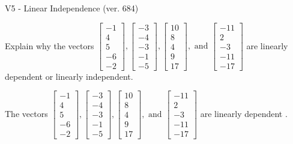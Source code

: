 \begin{exercise}
  \begin{exerciseTitle}V5 - Linear Independence (ver. 684)\end{exerciseTitle}
  \begin{exerciseStatement}
    Explain why the vectors \(\left[\begin{array}{r}
-1 \\
4 \\
5 \\
-6 \\
-2
\end{array}\right] , \left[\begin{array}{r}
-3 \\
-4 \\
-3 \\
-1 \\
-5
\end{array}\right] , \left[\begin{array}{r}
10 \\
8 \\
4 \\
9 \\
17
\end{array}\right] , \text{ and } \left[\begin{array}{r}
-11 \\
2 \\
-3 \\
-11 \\
-17
\end{array}\right]\) are linearly dependent or linearly independent.	


  \end{exerciseStatement}
  \begin{exerciseAnswer}
   The vectors \(\left[\begin{array}{r}
-1 \\
4 \\
5 \\
-6 \\
-2
\end{array}\right] , \left[\begin{array}{r}
-3 \\
-4 \\
-3 \\
-1 \\
-5
\end{array}\right] , \left[\begin{array}{r}
10 \\
8 \\
4 \\
9 \\
17
\end{array}\right] , \text{ and } \left[\begin{array}{r}
-11 \\
2 \\
-3 \\
-11 \\
-17
\end{array}\right]\) are 
  	 linearly dependent  .
  


  \end{exerciseAnswer}
\end{exercise}